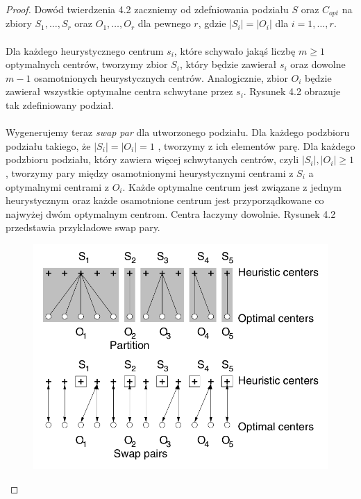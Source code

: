 \begin{proof}
    Dowód twierdzenia 4.2 zaczniemy od zdefniowania podziału $S$ oraz $C_{opt}$ na zbiory $S_{1}, \dots, S_{r}$ oraz $O_{1}, \dots, O_{r}$ dla pewnego $r$, gdzie $|S_{i}| = |O_{i}|$ dla $i = 1, \dots, r$.
    \\~\\
    Dla każdego heurystycznego centrum $s_{i}$, które schywało jakąś liczbę $m \geq 1$ optymalnych centrów, tworzymy zbior $S_{i}$, który będzie zawierał $s_{i}$ oraz dowolne $m-1$ osamotnionych heurystycznych centrów.
    Analogicznie, zbior $O_{i}$ będzie zawierał wszystkie optymalne centra schwytane przez $s_{i}$.
    Rysunek 4.2 obrazuje tak zdefiniowany podział.
    \\~\\
    \noindent
    Wygenerujemy teraz \textit{swap par} dla utworzonego podziału.
    Dla każdego podzbioru podziału takiego, że $|S_{i}| = |O_{i}| = 1$ , tworzymy z ich elementów parę.
    Dla każdego podzbioru podziału, który zawiera więcej schwytanych centrów, czyli $|S_{i}|, |O_{i}| \geq 1$, tworzymy pary między osamotnionymi heurystycznymi centrami z $S_{i}$ a optymalnymi centrami z $O_{i}$.
    Każde optymalne centrum jest związane z jednym heurystycznym oraz każde osamotnione centrum jest przyporządkowane co najwyżej dwóm optymalnym centrom.
    Centra łaczymy dowolnie. 
    Rysunek 4.2 przedstawia przykładowe swap pary.
    \begin{figure}[H]
        \centering
        \includegraphics[totalheight=8cm]{swap.png}
        \caption{}
    \end{figure}

\end{proof}
